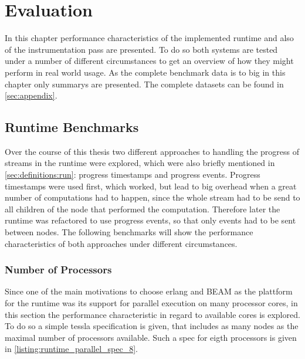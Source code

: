%
\chapter{Evaluation}
\label{sec:evaluation}

In this chapter performance characteristics of the implemented runtime and also of the instrumentation pass are presented.
To do so both systems are tested under a number of different circumstances to get an overview of how they might perform in real world usage.
As the complete benchmark data is to big in this chapter only summarys are presented.
The complete datasets can be found in \cref{sec:appendix}.

\section{Runtime Benchmarks}
\label{sec:evaluation:runtime_benchmarks}

Over the course of this thesis two different approaches to handling the progress of streams in the runtime were explored, which were also briefly mentioned in \cref{sec:definitions:run}: progress timestamps and progress events.
Progress timestamps were used first, which worked, but lead to big overhead when a great number of computations had to happen, since the whole stream had to be send to all children of the node that performed the computation.
Therefore later the runtime was refactored to use progress events, so that only events had to be sent between nodes.
The following benchmarks will show the performance characteristics of both approaches under different circumstances.

\subsection{Number of Processors}
\label{sec:evaluation:runtime_benchmarks:num_cores}

Since one of the main motivations to choose erlang and BEAM as the plattform for the runtime was its support for parallel execution on many processor cores, in this section the performance characteristic in regard to available cores is explored.
To do so a simple \gls{tessla} specification is given, that includes as many nodes as the maximal number of processors available.
Such a spec for eigth processors is given in \cref{listing:runtime_parallel_spec_8}.

\begin{figure}
  
\end{figure}

